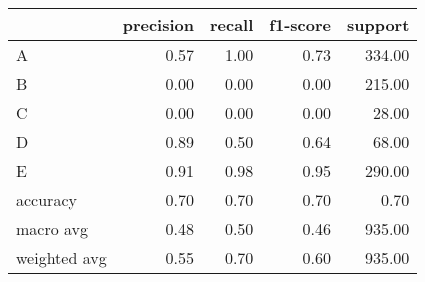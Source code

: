 \begin{tabular}{|l|r|r|r|r|}
\hline
{} &  precision &  recall &  f1-score &  support \\
\hline
A            &       0.57 &    1.00 &      0.73 &   334.00 \\
B            &       0.00 &    0.00 &      0.00 &   215.00 \\
C            &       0.00 &    0.00 &      0.00 &    28.00 \\
D            &       0.89 &    0.50 &      0.64 &    68.00 \\
E            &       0.91 &    0.98 &      0.95 &   290.00 \\
accuracy     &       0.70 &    0.70 &      0.70 &     0.70 \\
macro avg    &       0.48 &    0.50 &      0.46 &   935.00 \\
weighted avg &       0.55 &    0.70 &      0.60 &   935.00 \\
\hline
\end{tabular}
